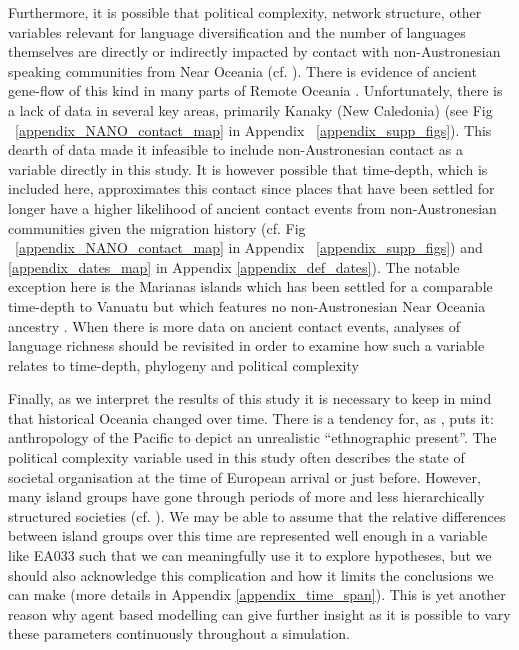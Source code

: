\documentclass[unnumsec,webpdf,modern,medium]{oup-authoring-template}
\begin{document}
Furthermore, it is possible that political complexity, network structure, other variables relevant for language diversification and the number of languages themselves are directly or indirectly impacted by contact with non-Austronesian speaking communities from Near Oceania (cf. \citet{lynch1981melanesian}). There is evidence of ancient gene-flow of this kind in many parts of Remote Oceania \citep{posth_jena_ancient_dna_vanuatu_2018, lipson_harvad_ancient_dna_vanuatu_2018, liu2022ancient}. Unfortunately, there is a lack of data in several key areas, primarily Kanaky (New Caledonia) (see Fig ~\ref{appendix_NANO_contact_map} in Appendix ~\ref{appendix_supp_figs}). This dearth of data made it infeasible to include non-Austronesian contact as a variable directly in this study. It is however possible that time-depth, which is included here, approximates this contact since places that have been settled for longer have a higher likelihood of ancient contact events from non-Austronesian communities given the migration history (cf. Fig ~\ref{appendix_NANO_contact_map} in Appendix ~\ref{appendix_supp_figs}) and \ref{appendix_dates_map} in Appendix \ref{appendix_def_dates}). The notable exception here is the Marianas islands which has been settled for a comparable time-depth to Vanuatu but which features no non-Austronesian Near Oceania ancestry \citep{liu2022ancient}. When there is more data on ancient contact events, analyses of language richness should be revisited in order to examine how such a variable relates to time-depth, phylogeny and political complexity

Finally, as we interpret the results of this study it is necessary to keep in mind that historical Oceania changed over time. There is a tendency for, as \citet{meleisea1995}, puts it: anthropology of the Pacific to depict an unrealistic ``ethnographic present''. The political complexity variable used in this study often describes the state of societal organisation at the time of European arrival or just before. However, many island groups have gone through periods of more and less hierarchically structured societies (cf. \citet[178-183]{skirgaard2020multilevel}). We may be able to assume that the relative differences between island groups over this time are represented well enough in a variable like EA033 such that we can meaningfully use it to explore hypotheses, but we should also acknowledge this complication and how it limits the conclusions we can make (more details in Appendix \ref{appendix_time_span}). This is yet another reason why agent based modelling can give further insight as it is possible to vary these parameters continuously throughout a simulation.
\end{document}
